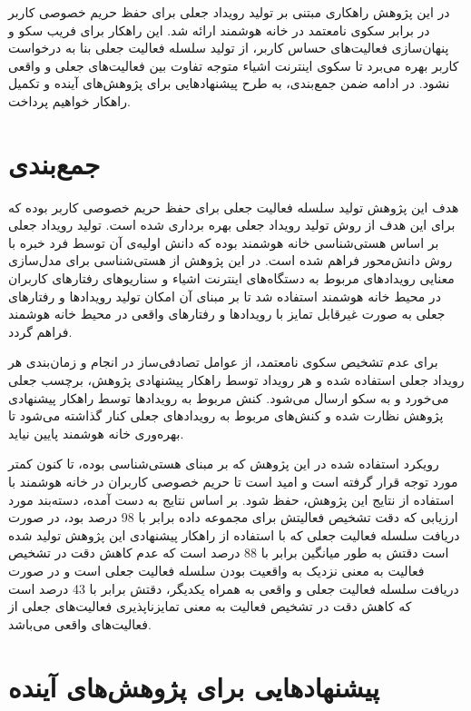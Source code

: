 
در این پژوهش راهکاری مبتنی بر تولید رویداد جعلی برای حفظ حریم خصوصی کاربر در برابر سکوی نامعتمد در خانه هوشمند ارائه شد. این راهکار برای فریب سکو و پنهان‌سازی فعالیت‌های حساس کاربر، از تولید سلسله فعالیت جعلی بنا به درخواست کاربر بهره می‌برد تا سکوی اینترنت اشیاء متوجه تفاوت بین فعالیت‌های جعلی و واقعی نشود. در ادامه ضمن جمع‌بندی، به طرح پیشنهادهایی برای پژوهش‌های آینده و تکمیل راهکار خواهیم پرداخت.

\section{جمع‌بندی}

هدف این پژوهش تولید سلسله فعالیت جعلی برای حفظ حریم خصوصی کاربر بوده که برای این هدف از روش تولید رویداد جعلی بهره برداری شده است. تولید رویداد جعلی بر اساس هستی‌شناسی خانه هوشمند بوده که دانش اولیه‌ی آن توسط فرد خبره با روش دانش‌محور فراهم شده است. در این پژوهش از هستی‌شناسی برای مدل‌سازی معنایی رویدادهای مربوط به دستگاه‌های اینترنت اشیاء و سناریوهای رفتارهای کاربران در محیط خانه هوشمند استفاده شد تا بر مبنای آن امکان تولید رویدادها و رفتارهای جعلی به صورت غیرقابل تمایز با رویدادها و رفتارهای واقعی در محیط خانه هوشمند فراهم گردد.

برای عدم تشخیص سکوی نامعتمد، از عوامل تصادفی‌ساز در انجام و زمان‌بندی هر رویداد جعلی استفاده شده و هر رویداد توسط راهکار پیشنهادی پژوهش، برچسب جعلی می‌خورد و به سکو ارسال می‌شود. کنش مربوط به رویدادها توسط راهکار پیشنهادی پژوهش نظارت شده و کنش‌های مربوط به رویدادهای جعلی کنار گذاشته می‌شود تا بهره‌وری خانه هوشمند پایین نیاید.

رویکرد استفاده شده در این پژوهش که بر مبنای هستی‌شناسی بوده، تا کنون کمتر مورد توجه قرار گرفته است و امید است تا حریم خصوصی کاربران در خانه هوشمند با استفاده از نتایج این پژوهش، حفظ شود. بر اساس نتایج به دست آمده، دسته‌بند مورد ارزیابی که دقت تشخیص فعالیتش برای مجموعه داده  برابر با 98 درصد بود، در صورت دریافت سلسله فعالیت جعلی که با استفاده از راهکار پیشنهادی این پژوهش تولید شده است دقتش به طور میانگین برابر با 88 درصد است که عدم کاهش دقت در تشخیص فعالیت به معنی نزدیک به واقعیت بودن سلسله فعالیت جعلی است و در صورت دریافت سلسله فعالیت جعلی و واقعی به همراه یکدیگر، دقتش برابر با 43 درصد است که کاهش دقت در تشخیص فعالیت به معنی تمایزناپذیری فعالیت‌های جعلی از فعالیت‌های واقعی می‌باشد.

\section{پیشنهادهایی برای پژوهش‌های آینده}

